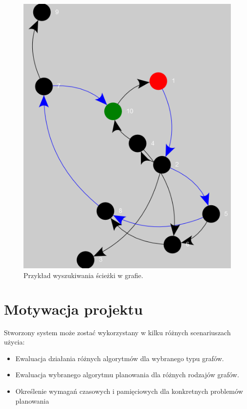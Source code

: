 \begin{figure}[!h]
	\centering
	\includegraphics{img/planowanie.png}
	\caption{Przykład wyszukiwania ścieżki w grafie.}
	\label{fig:planowanie}
\end{figure}

\section{Motywacja projektu}

Stworzony system może zostać wykorzystany w kilku różnych scenariuszach użycia:
\begin{itemize}
	\item Ewaluacja działania różnych algorytmów dla wybranego typu grafów.
	\item Ewaluacja wybranego algorytmu planowania dla różnych rodzajów grafów.
	\item Określenie wymagań czasowych i pamięciowych dla konkretnych problemów planowania
\end{itemize}